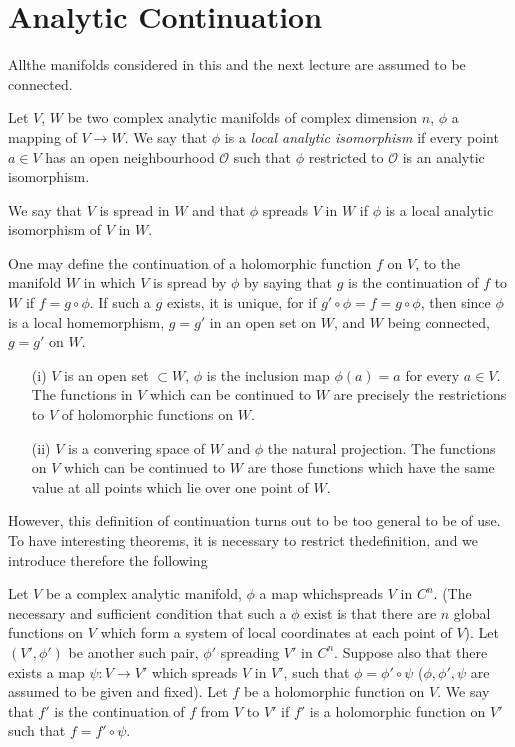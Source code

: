 
\chapter{Analytic Continuation}\label{chap4}

All\pageoriginale the manifolds considered in this and the next
lecture are assumed to be connected. 

\begin{defi*}
Let $V$, $W$ be two complex analytic manifolds of complex dimension
$n$, $\phi$ a mapping of $V \to W$. We say that $\phi$ is  a
\textit{local analytic isomorphism} if every point $a \in V$ has an
open neighbourhood $\mathscr{O}$ such that $\phi$ restricted to
$\mathscr{O}$ is an analytic isomorphism.
\end{defi*}

We say that $V$ is spread in $W$ and that $\phi$ spreads $V$ in $W$ if
$\phi$ is a local analytic isomorphism of $V$ in $W$.

One may define the continuation of a holomorphic function $f$ on $V$,
to the manifold $W$ in which $V$ is spread by $\phi$ by saying that
$g$ is the continuation of $f$ to $W$ if $f = g \circ \phi$. If such a
$g$ exists, it is unique, for if $g' \circ \phi = f = g\circ \phi$,
then since $\phi$ is a local homemorphism, $g = g'$ in an open set on
$W$, and $W$ being connected, $g = g'$ on $W$. 

\begin{example*}
\begin{itemize}
\item[(i)] $V$ is an open set $\subset W$, $\phi$ is the inclusion
  map $\phi (a) = a$ for every $a \in V$. The functions in $V$ which
  can be continued to $W$ are precisely the restrictions to $V$ of
  holomorphic functions on $W$.

\item[(ii)] $V$ is a convering space of $W$ and $\phi$ the natural
  projection. The functions on $V$ which can be continued to $W$ are
  those functions which have the same value at all points which lie
  over one point of $W$.
\end{itemize}

However, this definition of continuation turns out to be too general
to be of use. To have interesting theorems, it is necessary to
restrict the\pageoriginale definition, and we introduce therefore the
following
\end{example*}

\begin{defi*}
Let $V$ be a complex analytic manifold, $\phi$ a map which\break  spreads
$V$ in $C^n$. (The necessary and sufficient condition that such a
$\phi$ exist is that there are $n$ global functions on $V$ which form
a system of local coordinates at each point of $V$). Let $(V', \phi')$
be another such pair, $\phi'$ spreading $V'$ in $C^n$. Suppose also
that there exists a map $\psi : V \to V'$ which spreads $V$ in $V'$,
such that $\phi = \phi' \circ \psi$ ($\phi, \phi', \psi$ are assumed
to be given and fixed). Let $f$ be a holomorphic function on $V$. We
say that $f'$ is the continuation of $f$ from $V$ to $V'$ if $f'$ is a
holomorphic function on $V'$ such that $f=f' \circ \psi$.
\end{defi*}

